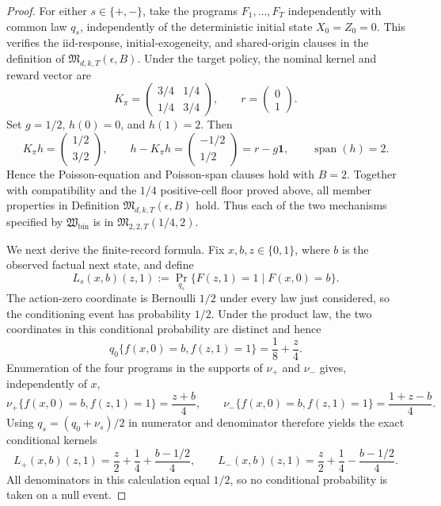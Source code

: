 \documentclass{article}
\begin{document}
\begin{proof}
For either \(s\in\{+,-\}\), take the programs \(F_1,\ldots,F_T\) independently with common law \(q_s\), independently of the deterministic initial state \(X_0=Z_0=0\).  This verifies the iid-response, initial-exogeneity, and shared-origin clauses in the definition of \(\mathfrak M_{d,k,T}(\epsilon,B)\).  Under the target policy, the nominal kernel and reward vector are
\[
 K_\pi=\begin{pmatrix}3/4&1/4\\[2pt]1/4&3/4\end{pmatrix},
 \qquad r=\begin{pmatrix}0\\1\end{pmatrix}.
\]
Set \(g=1/2\), \(h(0)=0\), and \(h(1)=2\).  Then
\[
 K_\pi h=\begin{pmatrix}1/2\\3/2\end{pmatrix},
 \qquad
 h-K_\pi h=\begin{pmatrix}-1/2\\1/2\end{pmatrix}
 =r-g\mathbf 1,
 \qquad
 \operatorname{span}(h)=2.
\]
Hence the Poisson-equation and Poisson-span clauses hold with \(B=2\).  Together with compatibility and the \(1/4\) positive-cell floor proved above, all member properties in Definition \(\mathfrak M_{d,k,T}(\epsilon,B)\) hold.  Thus each of the two mechanisms specified by \(\mathfrak W_{\mathrm{bin}}\) is in \(\mathfrak M_{2,2,T}(1/4,2)\).

We next derive the finite-record formula.  Fix \(x,b,z\in\{0,1\}\), where \(b\) is the observed factual next state, and define
\[
 L_s(x,b)(z,1)
 :=\Pr_{q_s}\{F(z,1)=1\mid F(x,0)=b\}.
\]
The action-zero coordinate is Bernoulli \(1/2\) under every law just considered, so the conditioning event has probability \(1/2\).  Under the product law, the two coordinates in this conditional probability are distinct and hence
\[
 q_0\{f(x,0)=b,f(z,1)=1\}=\frac18+\frac z4.
\]
Enumeration of the four programs in the supports of \(\nu_+\) and \(\nu_-\) gives, independently of \(x\),
\[
 \nu_+\{f(x,0)=b,f(z,1)=1\}=\frac{z+b}{4},
 \qquad
 \nu_-\{f(x,0)=b,f(z,1)=1\}=\frac{1+z-b}{4}.
\]
Using \(q_s=(q_0+\nu_s)/2\) in numerator and denominator therefore yields the exact conditional kernels
\[
 L_+(x,b)(z,1)=\frac z2+\frac14+\frac{b-1/2}{4},
 \qquad
 L_-(x,b)(z,1)=\frac z2+\frac14-\frac{b-1/2}{4}.
 \tag{1}
\]
All denominators in this calculation equal \(1/2\), so no conditional probability is taken on a null event.


\end{proof}
\end{document}
